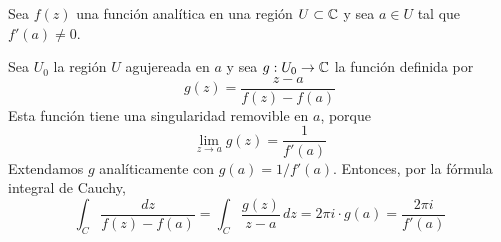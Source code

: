 \begin{exercise}
Sea $f(z)$ una función analítica en una región $U \subset \mathbb C$ y sea $a \in U$ tal que $f'(a) \ne 0$.
\end{exercise}

\begin{solution}
Sea $U_0$ la región $U$ agujereada en $a$ y sea $g : U_0 \to \mathbb C$ la función definida por
$$g(z) = \frac {z - a} {f(z) - f(a)}$$
Esta función tiene una singularidad removible en $a$, porque
$$\lim_{z \to a} g(z) = \frac 1 {f'(a)}$$
Extendamos $g$ analíticamente con $g(a) = 1 / f'(a)$. Entonces, por la fórmula integral de Cauchy,
$$\int_C \frac {dz} {f(z) - f(a)} = \int_C \frac {g(z)} {z - a} \, dz = 2\pi i \cdot g(a) = \frac {2\pi i} {f'(a)}$$
\end{solution}

\newpage
